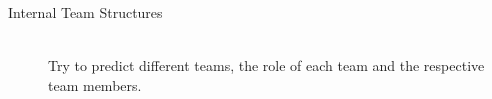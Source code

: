 \begin{description}
    \item[Internal Team Structures] \hfill \\
        Try to predict different teams, the role of each team and the respective team members.
\end{description}
